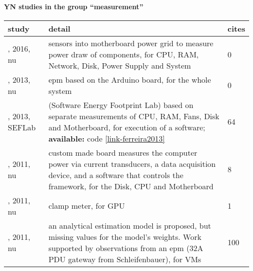 \paragraph{YN studies in the group ``measurement''} 
 \label{tab:YN-measurement} 
\begin{longtable}{|>{\raggedright\arraybackslash}p{2.75cm}|p{11.75cm}|p{0.7cm}|}
\toprule
\bfseries study & \bfseries detail & \bfseries cites \\
\midrule 
\endhead
\cite{hankel2016}, 2016, \acrshort{nu} & sensors into motherboard power grid to measure power draw of components, for CPU, RAM, Network, Disk, Power Supply and System & 0 \\
\cite{enam2013}, 2013, \acrshort{nu} & \acrshort{epm} based on the Arduino board, for the whole system & 0 \\
\cite{ferreira2013}, 2013, SEFLab &  (Software Energy Footprint Lab) based on separate measurements of CPU, RAM, Fans, Disk and Motherboard, for execution of a software; \textbf{available:} code \href{https://github.com/SEFLab}{\ref*{link-ferreira2013}} & 64 \\
\cite{piga2011}, 2011, \acrshort{nu} & custom made board measures the computer power via current transducers, a data acquisition device, and a software that controls the framework, for the Disk, CPU and Motherboard & 8 \\
\cite{matsumoto2011}, 2011, \acrshort{nu} & clamp meter, for GPU & 1 \\
\cite{chen2011}, 2011, \acrshort{nu} & an analytical estimation model is proposed, but missing values for the model's weights. Work supported by observations from an \acrshort{epm} (32A PDU gateway from Schleifenbauer), for VMs & 100 \\
\bottomrule
\end{longtable}
